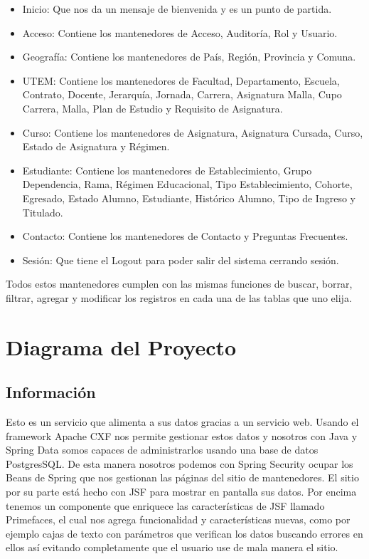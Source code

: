 \documentclass[a4paper,12pt,openany,oneside]{book}
\begin{document}
\begin{itemize}
	\item Inicio: Que nos da un mensaje de bienvenida y es un punto de partida.
	\item Acceso: Contiene los mantenedores de Acceso, Auditoría, Rol y Usuario.
	\item Geografía: Contiene los mantenedores de País, Región, Provincia y Comuna.
	\item UTEM: Contiene los mantenedores de Facultad, Departamento, Escuela, Contrato, Docente, Jerarquía, Jornada, Carrera, Asignatura Malla, Cupo Carrera, Malla, Plan de Estudio y Requisito de Asignatura.
	\item Curso: Contiene los mantenedores de Asignatura, Asignatura Cursada, Curso, Estado de Asignatura y Régimen.
	\item Estudiante: Contiene los mantenedores de Establecimiento, Grupo Dependencia, Rama, Régimen Educacional, Tipo Establecimiento, Cohorte, Egresado, Estado Alumno, Estudiante, Histórico Alumno, Tipo de Ingreso y Titulado.
	\item Contacto: Contiene los mantenedores de Contacto y Preguntas Frecuentes.
	\item Sesión: Que tiene el Logout para poder salir del sistema cerrando sesión.
\end{itemize}

Todos estos mantenedores cumplen con las mismas funciones de buscar, borrar, filtrar, agregar y modificar los registros en cada una de las tablas que uno elija.

\chapter{Diagrama del Proyecto}
\section{Información}
Esto es un servicio que alimenta a sus datos gracias a un servicio web. Usando el framework Apache CXF nos permite gestionar estos datos y nosotros con Java y Spring Data somos capaces de administrarlos usando una base de datos PostgresSQL. De esta manera nosotros podemos con Spring Security ocupar los Beans de Spring que nos gestionan las páginas del sitio de mantenedores. El sitio por su parte está hecho con JSF para mostrar en pantalla sus datos. Por encima tenemos un componente que enriquece las características de JSF llamado Primefaces, el cual nos agrega funcionalidad y características nuevas, como por ejemplo cajas de texto con parámetros que verifican los datos buscando errores en ellos así evitando completamente que el usuario use de mala manera el sitio.
\end{document}
